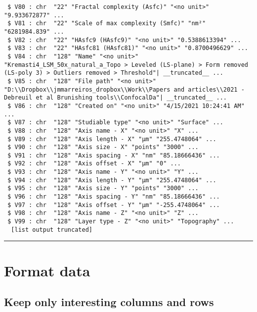\documentclass[
]{article}
\begin{document}
\begin{verbatim}
 $ V80 : chr  "22" "Fractal complexity (Asfc)" "<no unit>" "9.933672877" ...
 $ V81 : chr  "22" "Scale of max complexity (Smfc)" "nm²" "6281984.839" ...
 $ V82 : chr  "22" "HAsfc9 (HAsfc9)" "<no unit>" "0.5388613394" ...
 $ V83 : chr  "22" "HAsfc81 (HAsfc81)" "<no unit>" "0.8700496629" ...
 $ V84 : chr  "128" "Name" "<no unit>" "Kremasti4_LSM_50x_natural_a_Topo > Leveled (LS-plane) > Form removed (LS-poly 3) > Outliers removed > Threshold"| __truncated__ ...
 $ V85 : chr  "128" "File path" "<no unit>" "D:\\Dropbox\\jmmarreiros_dropbox\\Work\\Papers and articles\\2021 - Debreuil et al Brunishing tools\\ConfocalDa"| __truncated__ ...
 $ V86 : chr  "128" "Created on" "<no unit>" "4/15/2021 10:24:41 AM" ...
 $ V87 : chr  "128" "Studiable type" "<no unit>" "Surface" ...
 $ V88 : chr  "128" "Axis name - X" "<no unit>" "X" ...
 $ V89 : chr  "128" "Axis length - X" "µm" "255.4748064" ...
 $ V90 : chr  "128" "Axis size - X" "points" "3000" ...
 $ V91 : chr  "128" "Axis spacing - X" "nm" "85.18666436" ...
 $ V92 : chr  "128" "Axis offset - X" "µm" "0" ...
 $ V93 : chr  "128" "Axis name - Y" "<no unit>" "Y" ...
 $ V94 : chr  "128" "Axis length - Y" "µm" "255.4748064" ...
 $ V95 : chr  "128" "Axis size - Y" "points" "3000" ...
 $ V96 : chr  "128" "Axis spacing - Y" "nm" "85.18666436" ...
 $ V97 : chr  "128" "Axis offset - Y" "µm" "-255.4748064" ...
 $ V98 : chr  "128" "Axis name - Z" "<no unit>" "Z" ...
 $ V99 : chr  "128" "Layer type - Z" "<no unit>" "Topography" ...
  [list output truncated]
\end{verbatim}

\begin{center}\rule{0.5\linewidth}{0.5pt}\end{center}

\hypertarget{format-data}{%
\section{Format data}\label{format-data}}

\hypertarget{keep-only-interesting-columns-and-rows}{%
\subsection{Keep only interesting columns and
rows}\label{keep-only-interesting-columns-and-rows}}
\end{document}

